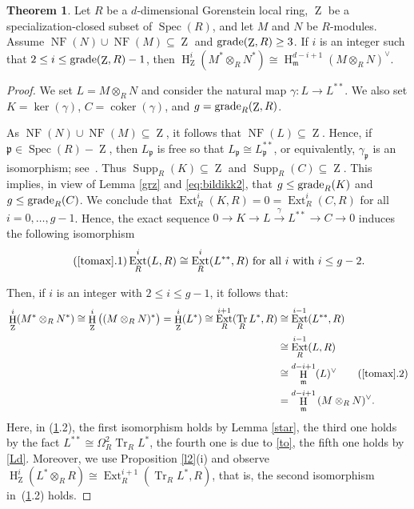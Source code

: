 \documentclass[11pt]{amsart}
\theoremstyle{definition}
\newtheorem{thm}{Theorem}[section]
\theoremstyle{definition}
\numberwithin{equation}{section}
\newcommand{\fm}{\mathfrak{m}}
\newcommand{\fp}{\mathfrak{p}}
\DeclareMathOperator{\gr}{\textnormal{grade}}
\DeclareMathOperator{\Tr}{Tr}
\DeclareMathOperator{\mz}{Z}
\DeclareMathOperator{\coker}{coker}
\DeclareMathOperator{\Ext}{Ext}
\DeclareMathOperator{\hh}{H}
\DeclareMathOperator{\Supp}{Supp}
\DeclareMathOperator{\Spec}{Spec}
\DeclareMathOperator{\NF}{NF}
\begin{document}
\begin{thm}\label{tomax} Let $R$ be a $d$-dimensional Gorenstein local ring, $\mz$ be a specialization-closed subset of $\Spec(R)$, and let $M$ and $N$ be $R$-modules. Assume $\NF(N)\cup\NF(M)\subseteq\mz$ and $\gr(\mz,R)\geq 3$. If $i$ is an integer such that $2\leq i\leq \gr(\mz,R)-1$, then
$\hh_{\mz}^i(M^\ast\otimes_RN^\ast) \cong \hh^{d-i+1}_{\fm} (M\otimes_RN)^{\vee}$. 
\end{thm}

\begin{proof} We set $L=M\otimes_RN$ and consider the natural map $\gamma:L\to L^{**}$. We also set $K=\ker(\gamma)$, $C=\coker(\gamma)$, and $g=\gr_R(\mz,R)$.

As $\NF(N)\cup\NF(M)\subseteq\mz$, it follows that $\NF(L)\subseteq\mz$. Hence, if $\fp \in \Spec(R)-\mz$, then $L_{\fp}$ is free so that $L_{\fp} \cong  L_{\fp}^{**}$, or equivalently, $\gamma_{\fp}$ is an isomorphism; see~\cite[1.1.9(b)]{Gdimbook}. Thus $\Supp_R(K)\subseteq \mz$ and $\Supp_R(C)\subseteq \mz$. This implies, in view of Lemma \ref{grz} and \eqref{eq:bildikk2}, that $g\leq \gr_R(K)$ and $g\leq \gr_R(C)$. We conclude that $\Ext^i_R(K,R)=0=\Ext^i_R(C,R)$ for all $i=0, \ldots, g-1$. Hence, the exact sequence $0 \to K \to L \overset{\gamma}{\rightarrow} L^{\ast\ast} \to C \to 0$ induces the following isomorphism
\begin{equation}\label{to}\tag{\ref*{tomax}.1}
\Ext^i_R(L,R)\cong\Ext^i_R(L^{**},R) \text{ for  all } i \text{ with } i\leq g-2.
\end{equation}

Then, if $i$ is an integer with $2\leq i\leq g-1$, it follows that:
\begin{align} \notag{}
\hh_{\mz}^i(M^\ast\otimes_RN^\ast) \cong \hh_{\mz}^i\big((M\otimes_RN)^\ast\big)=\hh_{\mz}^i(L^\ast)  \cong \Ext^{i+1}_R(\Tr_R L^*,R) & \cong \Ext^{i-1}_R(L^{**},R)  \notag{} \\ & \cong \Ext^{i-1}_R(L,R) \notag{} \\ & \cong \hh^{d-i+1}_{\fm}(L)^{\vee} \tag{\ref*{tomax}.2} \\ & = \hh^{d-i+1}_{\fm} \notag{} (M\otimes_RN)^{\vee}.
\end{align}
Here, in (\ref*{tomax}.2), the first isomorphism holds by Lemma \ref{star}, the third one holds by the fact $L^{**}\cong \Omega_R^2\Tr_R L^*$, the fourth one is due to \eqref{to}, the fifth one holds by \ref{Ld}. Moreover, we use Proposition \ref{l2}(i) and observe $\hh^{i}_{\mz}(L^{\ast}\otimes_RR)\cong\Ext^{i+1}_R(\Tr_R L^{\ast}, R)$, that is, the second isomorphism in~(\ref*{tomax}.2) holds.
\end{proof}
\end{document}
